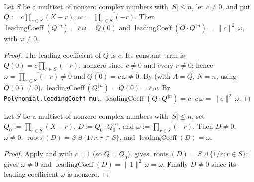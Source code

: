 \begin{lemma}
    \label{lem:fr-leadingcoeff-conjrecip}
    \leanok
    Let $S$ be a multiset of nonzero complex numbers with $|S| \le n$, let
    $c \neq 0$, and put $Q := c\prod_{r \in S}(X - r)$, $\omega :=
    \overline{\prod_{r \in S}(-r)}$. Then
    $\operatorname{leadingCoeff}(Q^{\dagger n}) = \overline{c}\,\omega
    = \overline{Q(0)}$ and
    $\operatorname{leadingCoeff}(Q\cdot Q^{\dagger n}) = \|c\|^2\,\omega$, with
    $\omega \neq 0$.
\end{lemma}
\begin{proof}
    The leading coefficient of $Q$ is $c$. Its constant term is
    $Q(0) = c\prod_{r \in S}(-r)$, nonzero since $c \neq 0$ and every $r \neq 0$;
    hence $\omega = \overline{\prod_{r \in S}(-r)} \neq 0$ and
    $\overline{Q(0)} = \overline{c}\,\omega \neq 0$. By
     (with $A = Q$, $N = n$, using $Q(0) \neq 0$),
    $\operatorname{leadingCoeff}(Q^{\dagger n}) = \overline{Q(0)}
    = \overline{c}\,\omega$. By \texttt{Polynomial.leadingCoeff\_mul},
    $\operatorname{leadingCoeff}(Q\cdot Q^{\dagger n})
    = c\cdot\overline{c}\,\omega = \|c\|^2\,\omega$.
\end{proof}

\begin{lemma}
    \label{lem:fr-positive-multiple-D}
    \leanok
    Let $S$ be a multiset of nonzero complex numbers with $|S| \le n$, set
    $Q_0 := \prod_{r \in S}(X - r)$, $D := Q_0\cdot Q_0^{\dagger n}$, and
    $\omega := \overline{\prod_{r \in S}(-r)}$. Then $D \neq 0$, $\omega \neq 0$,
    $\operatorname{roots}(D) = S \uplus \{1/\overline{r} : r \in S\}$, and
    $\operatorname{leadingCoeff}(D) = \omega$.
\end{lemma}
\begin{proof}
    Apply  and 
    with $c = 1$ (so $Q = Q_0$).  gives
    $\operatorname{roots}(D) = S \uplus \{1/\overline{r} : r \in S\}$;
     gives $\omega \neq 0$ and
    $\operatorname{leadingCoeff}(D) = \|1\|^2\,\omega = \omega$. Finally
    $D \neq 0$ since its leading coefficient $\omega$ is nonzero.
\end{proof}

